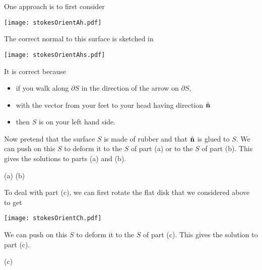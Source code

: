 \begin{solution} 
One approach is to first consider
\begin{center}
  \texttt{[image: stokesOrientAh.pdf]}
\end{center}
The correct normal to this surface is sketched in 
\begin{center}
  \texttt{[image: stokesOrientAhs.pdf]}
\end{center}
It is correct because 
    \begin{itemize}\itemsep1pt \parskip0pt  %
    \item
    if you walk along $\partial S$ in the direction of the arrow
    on $\partial S$,
     \item
     with the vector from your feet to your head  having direction $\hat{\mathbf{n}}$
    \item
    then $S$ is on your left hand side.
    \end{itemize}
Now pretend that the surface $S$ is made of rubber and that $\hat{\mathbf{n}}$ is glued to $S$. We can push on this $S$ to deform it to the $S$ of part (a) or to the $S$
of part (b). This gives the solutions to parts (a) and (b). 
\begin{center}
  (a)\quad {}\hfil
  (b)\quad {}
\end{center}
To deal with part (c), we can first rotate the flat disk that we considered above to get 
\begin{center}
  \texttt{[image: stokesOrientCh.pdf]}
\end{center}
We can push on this $S$ to deform it to the $S$ of part (c). This gives 
the solution to part (c).
\begin{center}
  (c)\quad {}
\end{center}
\end{solution}

